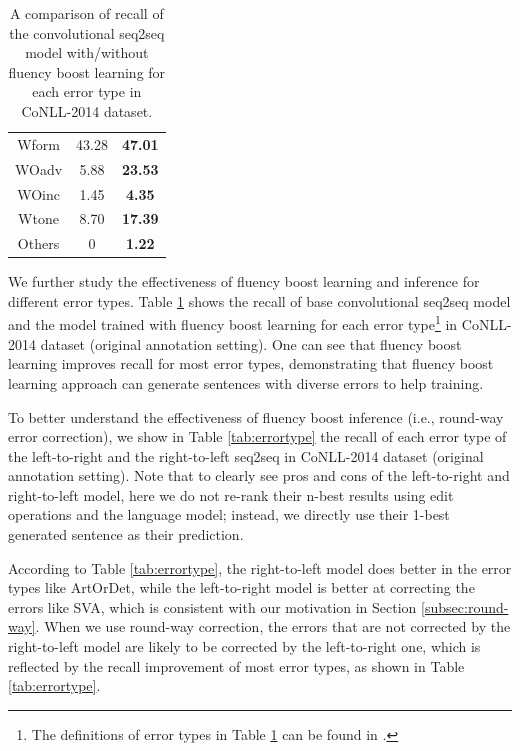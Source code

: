 \documentclass{article} %
\begin{document}
\begin{table}[t]
\begin{tabular}{c|c|c}
Wform      & 43.28                      & \bf 47.01              \\
WOadv      & 5.88                       & \bf 23.53              \\
WOinc      & 1.45                       & \bf 4.35               \\
Wtone      & 8.70                       & \bf 17.39              \\
Others     & 0                          & \bf 1.22              \\ \hline
\end{tabular}
\caption{A comparison of recall of the convolutional seq2seq model with/without fluency boost learning for each error type in CoNLL-2014 dataset.}
\label{tab:boost_errortype}
\end{table}

We further study the effectiveness of fluency boost learning and inference for different error types. Table \ref{tab:boost_errortype} shows the recall of base convolutional seq2seq model and the model trained with fluency boost learning for each error type\footnote{The definitions of error types in Table \ref{tab:boost_errortype} can be found in \cite{ng2014conll}.} in CoNLL-2014 dataset (original annotation setting). One can see that fluency boost learning improves recall for most error types, demonstrating that fluency boost learning approach can generate sentences with diverse errors to help training.

To better understand the effectiveness of fluency boost inference (i.e., round-way error correction), we show in Table \ref{tab:errortype} the recall of each error type of the left-to-right and the right-to-left seq2seq in CoNLL-2014 dataset (original annotation setting). Note that to clearly see pros and cons of the left-to-right and right-to-left model, here we do not re-rank their n-best results using edit operations and the language model; instead, we directly use their 1-best generated sentence as their prediction.

According to Table \ref{tab:errortype}, the right-to-left model does better in the error types like ArtOrDet, while the left-to-right model is better at correcting the errors like SVA, which is consistent with our motivation in Section \ref{subsec:round-way}. When we use round-way correction, the errors that are not corrected by the right-to-left model are likely to be corrected by the left-to-right one, which is reflected by the recall improvement of most error types, as shown in Table \ref{tab:errortype}.
\end{document}
